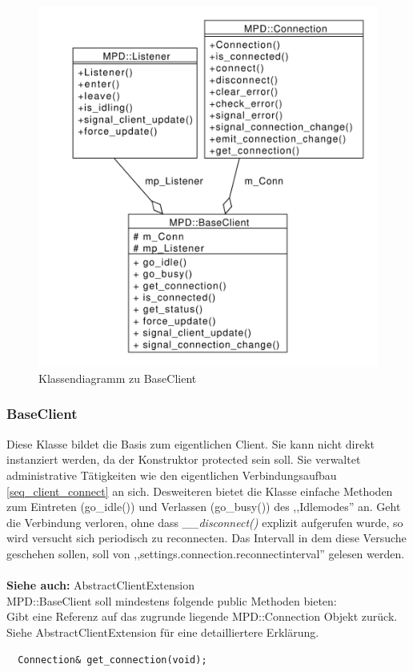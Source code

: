\begin{figure}[htb!]
	\centering
        \includegraphics[scale=0.55]{BaseClientCollab.pdf}
	\caption{Klassendiagramm zu BaseClient}
	\label{collab_base_client}
\end{figure}

\subsubsection{BaseClient}
Diese Klasse bildet die Basis zum eigentlichen Client. Sie kann nicht direkt instanziert werden, da
der Konstruktor protected sein soll.
Sie verwaltet administrative Tätigkeiten wie den eigentlichen Verbindungsaufbau \ref{seq_client_connect} an sich. 
Desweiteren bietet die Klasse einfache Methoden zum Eintreten (go\_idle()) und Verlassen (go\_busy()) des ,,Idlemodes'' an.
Geht die Verbindung verloren, ohne dass \emph{\_\_disconnect()} explizit aufgerufen wurde, so wird versucht sich periodisch zu reconnecten.
Das Intervall in dem diese Versuche geschehen sollen, soll von ,,settings.connection.reconnectinterval'' gelesen werden.
\\
\\
\textbf{Siehe auch:} AbstractClientExtension
\\
MPD::BaseClient soll mindestens folgende public Methoden bieten:
\\
Gibt eine Referenz auf das zugrunde liegende MPD::Connection Objekt zurück. 
Siehe AbstractClientExtension für eine detailliertere Erklärung.
\\
\begin{verbatim}
  Connection& get_connection(void);
\end{verbatim}

